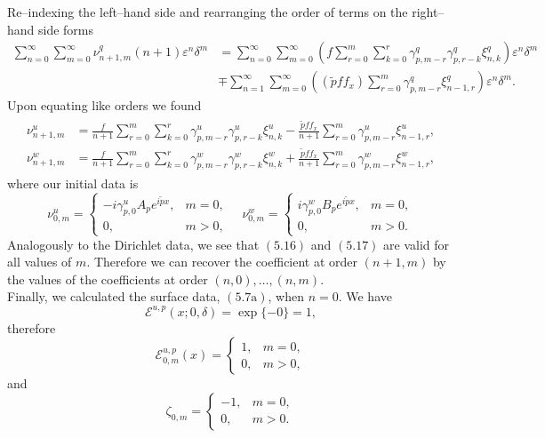Re--indexing the left--hand side and rearranging the order of terms on the right--hand side forms
\begin{align*}\sum_{n=0}^{\infty}\sum_{m=0}^{\infty}\nu^q_{n+1,m}(n+1)\varepsilon^n\delta^m&=
\sum_{n=0}^{\infty}\sum_{m=0}^{\infty}\left(f\sum_{r=0}^m \sum_{k=0}^r \gamma^{q}_{p,m-r}\gamma^{q}_{p,r-k}\xi^q_{n,k}\right)\varepsilon^n\delta^m\\&\mp
\sum_{n=1}^{\infty}\sum_{m=0}^{\infty}\left((\tilde{p}ff_x)\sum_{r=0}^m  \gamma^{q}_{p,m-r}\xi^q_{n-1,r}\right)\varepsilon^n\delta^m
.\end{align*}
Upon equating like orders we found
\begin{align}
\begin{split}
\nu^u_{n+1,m} &= \frac{f}{n+1}\sum_{r=0}^m \sum_{k=0}^r \gamma^{u}_{p,m-r}\gamma^{u}_{p,r-k}\xi^u_{n,k}-
\frac{\tilde{p}ff_x}{n+1}\sum_{r=0}^m  \gamma^{u}_{p,m-r}\xi^u_{n-1,r},\\
\nu^w_{n+1,m} &= \frac{f}{n+1}\sum_{r=0}^m \sum_{k=0}^r \gamma^{w}_{p,m-r}\gamma^{w}_{p,r-k}\xi^w_{n,k}+
\frac{\tilde{p}ff_x}{n+1}\sum_{r=0}^m  \gamma^{w}_{p,m-r}\xi^w_{n-1,r},
\end{split}
\end{align}
where our initial data is
\begin{equation}\mathcal{\nu}^u_{0,m}= 
\begin{cases} 
-i\gamma^{u}_{p,0}A_pe^{i\tilde{p}x}, & m=0, \\
0, & m>0,
\end{cases}  
 \quad 
\mathcal{\nu}^w_{0,m}= 
\begin{cases} 
i\gamma^{w}_{p,0}B_pe^{i\tilde{p}x}, & m=0, \\
0, & m>0.
\end{cases} \end{equation}
Analogously to the Dirichlet data, we see that $(5.16)$ and $(5.17)$ are valid for all values of $m$. Therefore we can recover the coefficient at order $(n+1,m)$ by the values of the coefficients at order $(n,0),\ldots ,(n,m)$.
\\
\newline
Finally, we calculated the surface data, $(5.7\text{a})$, when $n=0$. We have
$$\mathcal{E}^{u,p}(x;0,\delta)=\operatorname{exp}\{-0\}=1,$$
therefore 
$$\mathcal{E}^{u,p}_{0,m}(x)= 
\begin{cases} 
1, & m=0, \\
0, & m>0,
\end{cases} $$
and 
$$\zeta_{0,m}= 
\begin{cases} 
-1, & m=0, \\
0, & m>0.
\end{cases}
$$
